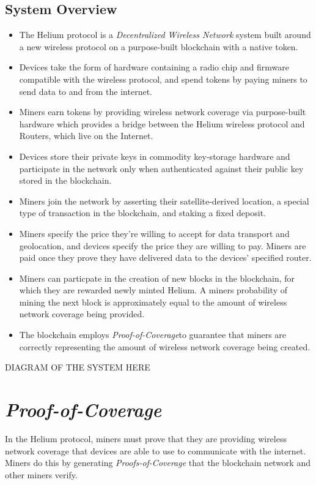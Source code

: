 \documentclass[letterpaper,11pt]{article}
\newcommand{\proofofcoverage}{\textit{Proof-of-Coverage}}
\begin{document}
\subsection{System Overview}

\begin{itemize}
	\item The Helium protocol is a \textit{Decentralized Wireless Network} system built around a new wireless protocol on a purpose-built blockchain with a native token. 
	\item Devices take the form of hardware containing a radio chip and firmware compatible with the wireless protocol, and spend tokens by paying miners to send data to and from the internet. 
	\item Miners earn tokens by providing wireless network coverage via purpose-built hardware which provides a bridge between the Helium wireless protocol and Routers, which live on the Internet.
	\item Devices store their private keys in commodity key-storage hardware and participate in the network only when authenticated against their public key stored in the blockchain.
	\item Miners join the network by asserting their satellite-derived location, a special type of transaction in the blockchain, and staking a fixed deposit.
	\item Miners specify the price they're willing to accept for data transport and geolocation, and devices specify the price they are willing to pay. Miners are paid once they prove they have delivered data to the devices' specified router.
	\item Miners can particpate in the creation of new blocks in the blockchain, for which they are rewarded newly minted Helium. A miners probability of mining the next block is approximately equal to the amount of wireless network coverage being provided.
	\item The blockchain employs \proofofcoverage to guarantee that miners are correctly representing the amount of wireless network coverage being created.
\end{itemize}

DIAGRAM OF THE SYSTEM HERE

\section{\proofofcoverage}

In the Helium protocol, miners must prove that they are providing wireless network coverage that devices are able to use to communicate with the internet. Miners do this by generating \textit{Proofs-of-Coverage} that the blockchain network and other miners verify.\newline
\end{document}
